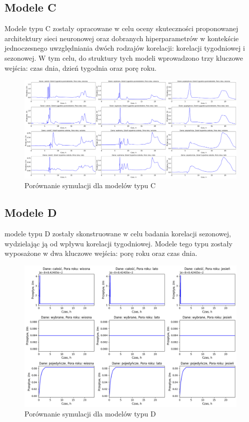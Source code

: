 \documentclass[a4paper,twoside,12pt]{book}
\begin{document}
\subsection*{Modele C}
Modele typu C zostały opracowane w celu oceny skuteczności proponowanej architektury sieci neuronowej oraz dobranych hiperparametrów w kontekście jednoczesnego uwzględniania dwóch rodzajów korelacji: korelacji tygodniowej i sezonowej. W tym celu, do struktury tych modeli wprowadzono trzy kluczowe wejścia: czas dnia, dzień tygodnia oraz porę roku.
\begin{figure}[!h]
  \centering
  \includegraphics[width=1\textwidth]{img/Model_C.png}
  \caption{Porównanie symulacji dla modelów typu C}
  \label{fig:etykieta-rysunku}
\end{figure}

\newpage
\subsection*{Modele D}
modele typu D zostały skonstruowane w celu badania korelacji sezonowej, wydzielając ją od wpływu korelacji tygodniowej. Modele tego typu zostały wyposażone w dwa kluczowe wejścia: porę roku oraz czas dnia.\\
\begin{figure}[!h]
  \centering
  \includegraphics[width=1\textwidth]{img/Model_D.png}
  \caption{Porównanie symulacji dla modelów typu D}
  \label{fig:etykieta-rysunku}
\end{figure}
\end{document}
